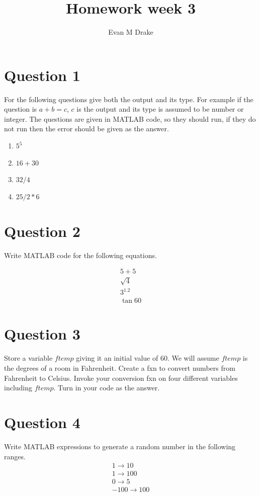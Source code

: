 \documentclass[12pt]{article}
\title{Homework week 3}
\author{
	Evan M Drake \\
	\texttt{}
}
\begin{document}
	\maketitle



	\section{Question 1}
		For the following questions give both the output and its type.
		For example if the question is $a + b = c$, $c$ is the output and its type is assumed to be number or integer.
		The questions are given in MATLAB code,
			so they should run,
			if they do not run then the error should be given as the answer.

		\begin{enumerate}
			\item $5^5$
			\item $16 + 30$
			\item $32/4$
			\item $25/2 * 6$
		\end{enumerate}

		\setcounter{equation}{0}
	\section{Question 2}
		Write MATLAB code for the following equations.

		\begin{align}
			5 + 5 \\
			\sqrt{4} \\
			3^1.2 \\
			\tan{60}
		\end{align}

		\setcounter{equation}{0}
	\section{Question 3}
		Store a variable $ftemp$ giving it an initial value of 60.
		We will assume $ftemp$ is the degrees of a room in Fahrenheit.
		Create a fxn to convert numbers from Fahrenheit to Celsius.
		Invoke your conversion fxn on four different variables including $ftemp$.
		Turn in your code as the answer.

	\section{Question 4}
		Write MATLAB expressions to generate a random number in the following ranges.
		\begin{align*}
			1 \rightarrow 10 \\
			1 \rightarrow 100 \\
			0 \rightarrow 5 \\
			-100 \rightarrow 100
		\end{align*}
\end{document}
